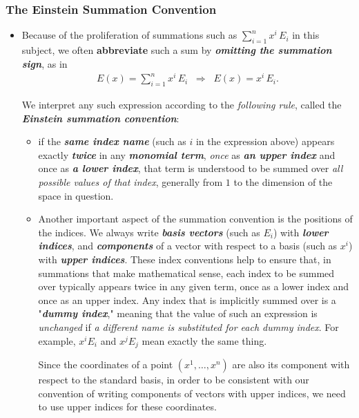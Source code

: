 \documentclass[11pt]{article}
\begin{document}
\subsubsection{The Einstein Summation Convention}
\begin{itemize}
\item Because of the proliferation of summations such as $\sum_{i=1}^{n}x^{i}\,E_{i}$ in this subject, we often \textbf{abbreviate} such a sum by \emph{\textbf{omitting the summation sign}}, as in
\begin{align*}
E(x) = \sum_{i=1}^{n}x^{i}\,E_{i}\;\; \Rightarrow \;\; E(x) = x^{i}\,E_{i}.
\end{align*}

We interpret any such expression according to the \emph{following rule}, called the \emph{\textbf{Einstein summation convention}}:
\begin{itemize}
\item if the \textbf{\emph{same index name}} (such as $i$ in the expression above) appears exactly \textbf{\emph{twice}} in any \emph{\textbf{monomial term}}, \emph{once} as \emph{\textbf{an upper index}} and once as \emph{\textbf{a lower index}}, that term is understood to be summed over \emph{all possible values of that index}, generally from $1$ to the dimension of the space in question. 

\item Another important aspect of the summation convention is the positions of the indices. We always write \emph{\textbf{basis vectors}} (such as $E_i$) with \emph{\textbf{lower indices}}, and \textbf{\emph{components}} of a vector with respect to a basis (such as $x^i$) with \emph{\textbf{upper indices}}. These index conventions help to ensure that, in summations that make mathematical sense, each index to be summed over typically appears twice in any given term, once as a lower index and once as an upper index. Any index that is implicitly summed over is a "\emph{\textbf{dummy index}}," meaning that the value of such an expression is \emph{unchanged} if \emph{a different name is substituted for each dummy index}. For example, $x^i E_i$ and $x^j E_j$ mean exactly the same thing. 

Since the coordinates of a point $(x^1,\ldots, x^n)$ are also its component with respect to the standard basis, in order to be consistent with our convention of writing components of vectors with upper indices, we need to use upper indices for these coordinates.
\end{itemize}
\end{itemize}
\end{document}
